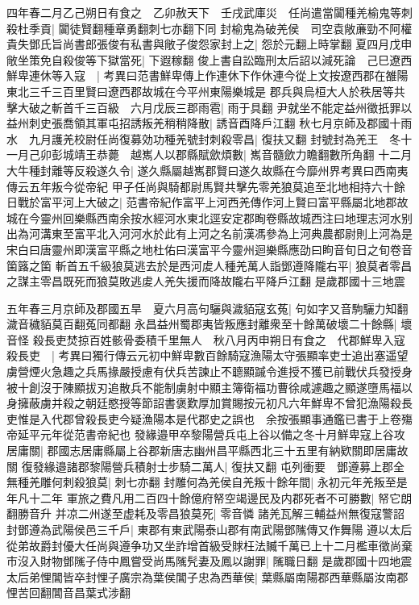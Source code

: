 四年春二月乙己朔日有食之　乙卯赦天下　壬戌武庫災　任尚遣當闐種羌榆鬼等刺殺杜季貢|{
	闐徒賢翻種章勇翻刺七亦翻下同}
封榆鬼為破羌侯　司空袁敞亷勁不阿權貴失鄧氏旨尚書郎張俊有私書與敞子俊怨家封上之|{
	怨於元翻上時掌翻}
夏四月戊申敞坐策免自殺俊等下獄當死|{
	下遐稼翻}
俊上書自訟臨刑太后詔以減死論　己巳遼西鮮卑連休等入寇　|{
	考異曰范書鮮卑傳上作連休下作休連今從上文按遼西郡在雒陽東北三千三百里賢曰遼西郡故城在今平州東陽樂城是}
郡兵與烏桓大人於秩居等共擊大破之斬首千三百級　六月戊辰三郡雨雹|{
	雨于具翻}
尹就坐不能定益州徵扺罪以益州刺史張喬領其軍屯招誘叛羌稍稍降散|{
	誘音酉降戶江翻}
秋七月京師及郡國十雨水　九月護羌校尉任尚復募効功種羌號封刺殺零昌|{
	復扶又翻}
封號封為羌王　冬十一月己卯彭城靖王恭薨　越嶲人以郡縣賦歛煩數|{
	嶲音髓歛力瞻翻數所角翻}
十二月大牛種封離等反殺遂久令|{
	遂久縣屬越嶲郡賢曰遂久故縣在今靡州界考異曰西南夷傳云五年叛今從帝紀}
甲子任尚與騎都尉馬賢共擊先零羌狼莫追至北地相持六十餘日戰於富平河上大破之|{
	范書帝紀作富平上河西羌傳作河上賢曰富平縣屬北地郡故城在今靈州回樂縣西南余按水經河水東北逕安定郡眴卷縣故城西注曰地理志河水别出為河溝東至富平北入河河水於此有上河之名前漢馮參為上河典農都尉則上河為是宋白曰唐靈州即漢富平縣之地杜佑曰漢富平今靈州迴樂縣應劭曰眗音旬日之旬卷音箘簬之箘}
斬首五千級狼莫逃去於是西河䖍人種羌萬人詣鄧遵降隴右平|{
	狼莫者零昌之謀主零昌既死而狼莫敗逃䖍人羌失援而降故隴右平降戶江翻}
是歲郡國十三地震

五年春三月京師及郡國五旱　夏六月高句驪與濊貊寇玄菟|{
	句如字又音駒驪力知翻濊音穢貊莫百翻菟同都翻}
永昌益州蜀郡夷皆叛應封離衆至十餘萬破壞二十餘縣|{
	壞音怪}
殺長吏焚掠百姓骸骨委積千里無人　秋八月丙申朔日有食之　代郡鮮卑入寇殺長吏　|{
	考異曰獨行傳云元初中鮮卑數百餘騎寇漁陽太守張顯率吏士追出塞遥望虜營煙火急趣之兵馬掾嚴授慮有伏兵苦諫止不聼顯䠞令進授不獲已前戰伏兵發授身被十創沒于陳顯拔刃追散兵不能制虜射中顯主簿衛福功曹徐咸遽趣之顯遂墮馬福以身擁蔽虜并殺之朝廷愍授等節詔書褒歎厚加賞賜按元初凡六年鮮卑不曾犯漁陽殺長吏惟是入代郡曾殺長吏今疑漁陽本是代郡史之誤也　余按張顯事通鑑已書于上卷殤帝延平元年從范書帝紀也}
發緣邉甲卒黎陽營兵屯上谷以備之冬十月鮮卑寇上谷攻居庸關|{
	郡國志居庸縣屬上谷郡新唐志幽州昌平縣西北三十五里有納欵關即居庸故關}
復發緣邉諸郡黎陽營兵積射士步騎二萬人|{
	復扶又翻}
屯列衝要　鄧遵募上郡全無種羌雕何刺殺狼莫|{
	刺七亦翻}
封雕何為羌侯自羌叛十餘年間|{
	永初元年羌叛至是年凡十二年}
軍旅之費凡用二百四十餘億府帑空竭邊民及内郡死者不可勝數|{
	帑它朗翻勝音升}
并凉二州遂至虚耗及零昌狼莫死|{
	零音憐}
諸羌瓦解三輔益州無復寇警詔封鄧遵為武陽侯邑三千戶|{
	東郡有東武陽泰山郡有南武陽鄧隲傳又作舞陽}
遵以太后從弟故爵封優大任尚與遵争功又坐詐增首級受賕枉法贓千萬已上十二月檻車徵尚棄市沒入財物鄧隲子侍中鳳嘗受尚馬隲髠妻及鳳以謝罪|{
	隲職日翻}
是歲郡國十四地震　太后弟悝閶皆卒封悝子廣宗為葉侯閶子忠為西華侯|{
	葉縣屬南陽郡西華縣屬汝南郡悝苦回翻閶音昌葉式涉翻}


